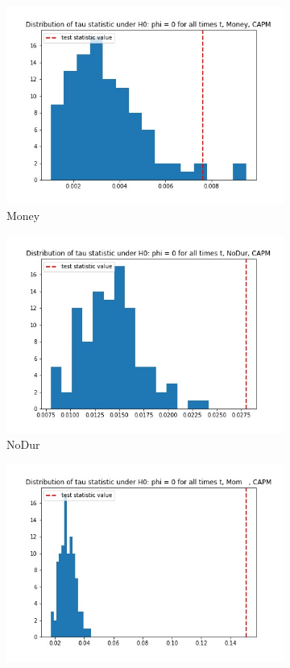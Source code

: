 \documentclass{article}
\begin{document}
\begin{figure}
\begin{subfigure}[b]{0.5\textwidth}
    \includegraphics[width=\textwidth]{Money/tau_hist_02_CAPM.jpg}
    \caption{Money}
    \label{fig:2}
  \end{subfigure}
  \begin{subfigure}[b]{0.5\textwidth}
    \centering
    \includegraphics[width=\textwidth]{NoDur/tau_hist_02_CAPM.jpg}
    \caption{NoDur}
    \label{fig:2}
  \end{subfigure}
  \begin{subfigure}[b]{0.5\textwidth}
    \centering
    \includegraphics[width=\textwidth]{Mom/tau_hist_02_CAPM.jpg}

\end{subfigure}
\end{figure}
\end{document}
